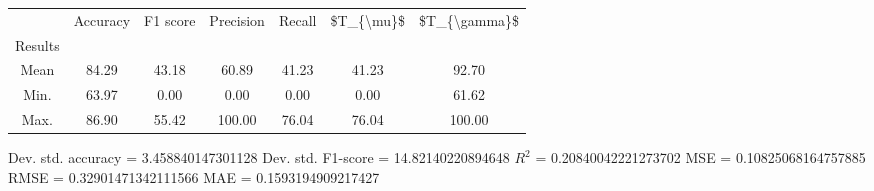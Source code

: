 \begin{tabular}{|c|c|c|c|c|c|c|}
\toprule
{} &  Accuracy &  F1 score &  Precision &  Recall &  \$T\_\{\textbackslash mu\}\$ &  \$T\_\{\textbackslash gamma\}\$ \\
Results &           &           &            &         &            &               \\
\hline
Mean    &     84.29 &     43.18 &      60.89 &   41.23 &      41.23 &         92.70 \\
Min.    &     63.97 &      0.00 &       0.00 &    0.00 &       0.00 &         61.62 \\
Max.    &     86.90 &     55.42 &     100.00 &   76.04 &      76.04 &        100.00 \\
\bottomrule
\end{tabular}

 Dev. std. accuracy = 3.458840147301128
 Dev. std. F1-score = 14.82140220894648
 $R^2$ = 0.20840042221273702
 MSE = 0.10825068164757885
 RMSE = 0.32901471342111566
 MAE = 0.1593194909217427
